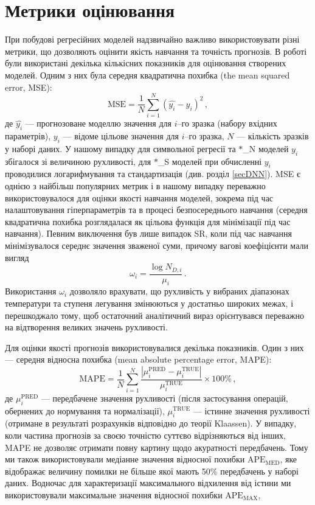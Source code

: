 \documentclass[12pt,a4paper,titlepage,oneside]{book}
\numberwithin{equation}{part}
\begin{document}
\section{Метрики оцінювання}

При побудові регресійних моделей надзвичайно важливо використовувати різні метрики,
що дозволяють оцінити якість навчання та точність прогнозів.
В роботі були використані декілька кількісних показників для оцінювання створених моделей.
Одним з них була середня квадратична похибка (the mean squared error, MSE):
\begin{equation}
\label{eqMSE}
    \mathrm{MSE} = \frac{1}{N}\displaystyle\sum_{i=1}^{N} (\hat{y_i}-y_i)^2\,,
\end{equation}
де
$\hat{y_i}$ --- прогнозоване моделлю значення для $i$--го зразка (набору вхідних параметрів),
$y_i$ --- відоме цільове значення для $i$--го зразка,
$N$ --- кількість зразків у наборі даних.
У нашому випадку для символьної регресії та $*$\_N моделей $y_i$ збігалося зі величиною рухливості,
для $*$\_S моделей при обчисленні $y_i$ проводилися логарифмування та стандартизація (див. розділ \ref{secDNN}).
MSE є однією з найбільш популярних метрик і в нашому випадку переважно використовувалося для оцінки якості
навчання моделей, зокрема під час налаштовування гіперпараметрів та в процесі безпосереднього навчання (середня квадратична похибка розглядалася як
цільова функція для мінімізації під час навчання).
Певним виключення був лише випадок SR, коли під час навчання мінімізувалося середнє значення зваженої суми, причому вагові коефіцієнти мали вигляд
\begin{equation}
\label{eqWi}
    \omega_i = \frac{\log N_{D,i}}{\mu_i}\,.
\end{equation}
Використання $\omega_i$ дозволяло врахувати, що рухливість у вибраних діапазонах температури та ступеня легування
змінюються у достатньо широких межах, і перешкоджало тому, щоб остаточний аналітичний вираз орієнтувався переважно
на відтворення великих значень рухливості.

Для оцінки якості прогнозів використовувалися декілька показників.
Один з них --- середня відносна похибка (mean absolute percentage error, MAPE):
\begin{equation}
\label{eqMAPE}
    \mathrm{MAPE} = \frac{1}{N}\displaystyle\sum_{i=1}^{N} \frac{|\mu^\mathrm{PRED}_i-\mu^\mathrm{TRUE}_i|}{\mu^\mathrm{TRUE}_i}\times 100 \%\,,
\end{equation}
де
$\mu^\mathrm{PRED}_i$ --- передбачене значення рухливості (після застосування операцій, обернених до нормування та нормалізації),
$\mu^\mathrm{TRUE}_i$ --- істинне значення рухливості (отримане в результаті розрахунків відповідно до теорії Klaassen).
У випадку, коли частина прогнозів за своєю точністю суттєво відрізняються від інших, MAPE  не дозволяє отримати повну картину щодо акуратності передбачень.
Тому ми також використовували медіанне значення відносної похибки $\mathrm{APE}_\mathrm{MED}$,
яке відображає величину помилки не більше якої мають 50\% передбачень у наборі даних.
Водночас для характеризації максимального відхилення від істини ми використовували максимальне значення  відносної похибки
$\mathrm{APE}_\mathrm{MAX}$,
\end{document}
